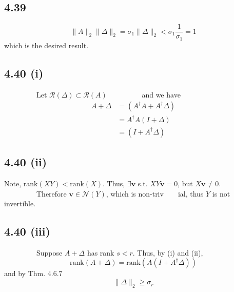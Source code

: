 \documentclass[letterpaper,12pt]{article}
\theoremstyle{definition}
\begin{document}
\subsection*{4.39}


\[
    \|A\|_2 \|\Delta\|_2 = \sigma_1 \|\Delta\|_2 < \sigma_1 \frac{1}{\sigma_1} = 1
\]
which is the desired result.

\subsection*{4.40 (i)}


         Let $\mathscr{R}(\Delta) \subset \mathscr{R}(A)$
         and we have
         \begin{align*}
             A + \Delta & = (A^\dagger A+A^\dagger \Delta)\\
             & = A^\dagger A (I + \Delta) \\
             & = (I +A^\dagger \Delta)
         \end{align*}
\subsection*{4.40 (ii)}
Note, rank$(XY) <    \text{rank}(X)$. Thus, $\exists \mathbf{v}$ s.t. $XY \mathbf{v} = 0$, but $X     \mathbf{v} \neq 0$.\\
         Therefore $\mathbf{v} \in \mathscr{N}(Y)$, which is non-triv    ial, thus $Y$ is not invertible.
\subsection*{4.40 (iii)}
         Suppose $A + \Delta$ has rank $s < r$. Thus, by (i) and (ii), 
         \[ \text{rank} (A + \Delta) = \text{rank}(A(I + A^\dagger \Delta))\]
and by Thm. 4.6.7
        \[\|\Delta\|_2 \geq \sigma_r\]
\end{document}
